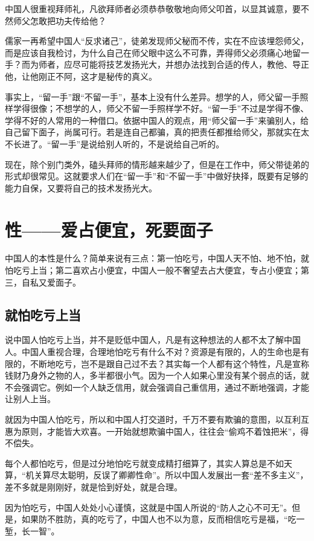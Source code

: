 \documentclass[fontset=fandol, a4paper, 12pt, openright]{ctexbook}
\begin{document}
中国人很重视拜师礼，凡欲拜师者必须恭恭敬敬地向师父叩首，以显其诚意，要不然师父怎敢把功夫传给他？

儒家一再希望中国人“反求诸己”，徒弟发现师父秘而不传，实在不应该埋怨师父，而是应该自我检讨，为什么自己在师父眼中这么不可靠，弄得师父必须痛心地留一手？而为师者，应尽可能将技艺发扬光大，并想办法找到合适的传人，教他、导正他，让他刚正不阿，这才是秘传的真义。

事实上，“留一手”跟“不留一手”，基本上没有什么差异。想学的人，师父留一手照样学得很像；不想学的人，师父不留一手照样学不好。“留一手”不过是学得不像、学得不好的人常用的一种借口。依据中国人的观点，用“师父留一手”来骗别人，给自己留下面子，尚属可行。若是连自己都骗，真的把责任都推给师父，那就实在太不长进了。“留一手”是说给别人听的，不是说给自己听的。

现在，除个别门类外，磕头拜师的情形越来越少了，但是在工作中，师父带徒弟的形式却很常见。这就要求人们在“留一手”和“不留一手”中做好抉择，既要有足够的能力自保，又要将自己的技术发扬光大。

\chapter{性——爱占便宜，死要面子}
中国人的本性是什么？简单来说有三点：第一怕吃亏，中国人天不怕、地不怕，就怕吃亏上当；第二喜欢占小便宜，中国人一般不奢望去占大便宜，专占小便宜；第三，自私又爱面子。

\section{就怕吃亏上当}

说中国人怕吃亏上当，并不是贬低中国人，凡是有这种想法的人都不太了解中国人。中国人重视合理，合理地怕吃亏有什么不对？资源是有限的，人的生命也是有限的，不断地吃亏，岂不是跟自己过不去？其实每一个人都有这个特性，凡是宣称钱财乃身外之物的人，多半都很小气。因为一个人如果心里没有某个弱点的话，就不会强调它。例如一个人缺乏信用，就会强调自己重信用，通过不断地强调，才能让别人上当。

就因为中国人怕吃亏，所以和中国人打交道时，千万不要有欺骗的意图，以互利互惠为原则，才能皆大欢喜。一开始就想欺骗中国人，往往会“偷鸡不着蚀把米”，得不偿失。

每个人都怕吃亏，但是过分地怕吃亏就变成精打细算了，其实人算总是不如天算，“机关算尽太聪明，反误了卿卿性命”。所以中国人发展出一套“差不多主义”，差不多就是刚刚好，就是恰到好处，就是合理。

因为怕吃亏，中国人处处小心谨慎，这就是中国人所说的“防人之心不可无”。但是，如果防不胜防，真的吃亏了，中国人也不以为意，反而相信吃亏是福，“吃一堑，长一智”。
\end{document}
